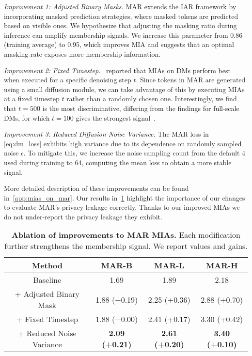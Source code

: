 \textit{Improvement 1: Adjusted Binary Masks.}
MAR extends the IAR framework by incorporating masked prediction strategies, where masked tokens are predicted based on visible ones. 
We hypothesize that adjusting the masking ratio during inference can amplify membership signals. We increase this parameter from 0.86 (training average) to 0.95, which improves MIA and suggests that an optimal masking rate exposes more membership information.


\textit{Improvement 2: Fixed Timestep.}~\citet{carlini2023extracting} reported that MIAs on DMs perform best when executed for a specific denoising step \( t \). Since tokens in MAR are generated using a small diffusion module, we can take advantage of this by executing MIAs at a fixed timestep \( t \) rather than a randomly chosen one. Interestingly, we find that \( t = 500 \) is the most discriminative, differing from the findings for full-scale DMs, for which $t=100$ gives the strongest signal~\citet{carlini2023extracting}.

\textit{Improvement 3: Reduced Diffusion Noise Variance.}  
The MAR loss in \cref{eq:dm_loss} exhibits high variance due to its dependence on randomly sampled noise $\epsilon$. To mitigate this, we increase the noise sampling count from the default 4 used during training to 64, computing the mean loss to obtain a more stable signal.

More detailed description of these improvements can be found in~\cref{app:mias_on_mar}. Our results in~\cref{tab:mar_mia_improv_abl} highlight the importance of our changes to evaluate MAR's privacy leakage correctly. Thanks to our improved MIAs we do not under-report the privacy leakage they exhibit.

\begin{table}[t!]
    \scriptsize
    \centering
    \caption{\textbf{Ablation of improvements to MAR MIAs.} Each modification further strengthens the membership signal. We report \tprat values and gains.}
    \begin{tabular}{cccc}
        \toprule
        \textbf{Method} & \textbf{MAR-B} & \textbf{MAR-L} & \textbf{MAR-H} \\
        \midrule
Baseline & 1.69 & 1.89 & 2.18 \\
+ Adjusted Binary Mask & 1.88 (+0.19) & 2.25 (+0.36) & 2.88 (+0.70) \\
+ Fixed Timestep & 1.88 (+0.00) & 2.41 (+0.17) & 3.30 (+0.42) \\
+ Reduced Noise Variance & \textbf{2.09 (+0.21)} & \textbf{2.61 (+0.20)} & \textbf{3.40 (+0.10)} \\
        \bottomrule
    \end{tabular}
    \label{tab:mar_mia_improv_abl}
\end{table}

